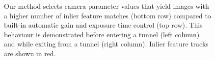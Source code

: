 \documentclass[letterpaper, 10pt, journal, twoside]{IEEEtran}
\begin{document}
\begin{figure}[t!]
	\centering
	\setlength{\fboxsep}{0pt}%
	\setlength{\fboxrule}{1pt}%
	\vspace{1mm}
	\caption{Our method selects camera parameter values that yield images with a higher number of inlier feature matches (bottom row) compared to built-in automatic gain and exposure time control (top row). This behaviour is demonstrated before entering a tunnel (left column) and while exiting from a tunnel (right column). Inlier feature tracks are shown in red.}
	\label{fig1}
	\vspace{-4mm}
\end{figure}
\end{document}
